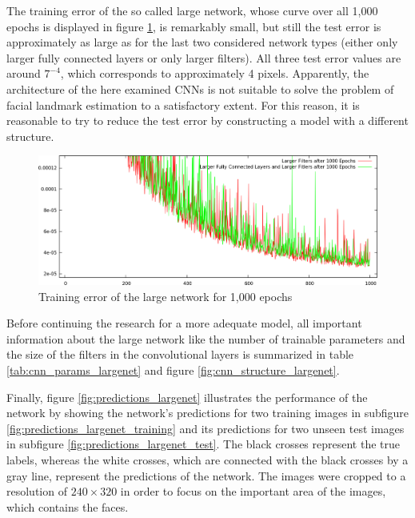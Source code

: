 \documentclass[11pt, a4paper]{article}
\begin{document}


The training error of the so called large network, whose curve over all 1,000 epochs is displayed in figure \ref{fig:cnn_largenet_1000}, is remarkably small, but still the test error is approximately as large as for the last two considered network types (either only larger fully connected layers or only larger filters). All three test error values are around $7^{-4}$, which corresponds to approximately 4 pixels. Apparently, the architecture of the here examined \acp{CNN} is not suitable to solve the problem of facial landmark estimation to a satisfactory extent. For this reason, it is reasonable to try to reduce the test error by constructing a model with a different structure.
\begin{figure}[h!]
	\centering
	\includegraphics[width=\textwidth]{results/cnn_largenet.png}
	\caption{Training error of the large network for 1,000 epochs}
	\label{fig:cnn_largenet_1000}
\end{figure}

Before continuing the research for a more adequate model, all important information about the large network like the number of trainable parameters and the size of the filters in the convolutional layers is summarized in table \ref{tab:cnn_params_largenet} and figure \ref{fig:cnn_structure_largenet}.





Finally, figure \ref{fig:predictions_largenet} illustrates the performance of the network by showing the network's predictions for two training images in subfigure \ref{fig:predictions_largenet_training} and its predictions for two unseen test images in subfigure \ref{fig:predictions_largenet_test}. The black crosses represent the true labels, whereas the white crosses, which are connected with the black crosses by a gray line, represent the predictions of the network. The images were cropped to a resolution of $240\times320$ in order to focus on the important area of the images, which contains the faces.
\end{document}
